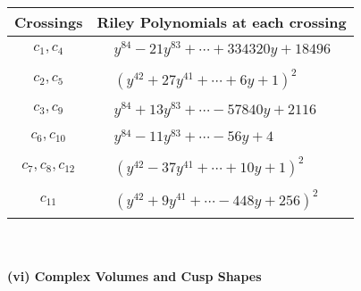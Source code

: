 \documentclass[1p]{elsarticle_modified}
\theoremstyle{definition}
\begin{document}
\begin{tabular}{m{50pt}|m{274pt}}
Crossings & \hspace{64pt}Riley Polynomials at each crossing \\
\hline $$\begin{aligned}c_{1},c_{4}\end{aligned}$$&$\begin{aligned}
&y^{84}-21 y^{83}+\cdots+334320 y+18496
\end{aligned}$\\
\hline $$\begin{aligned}c_{2},c_{5}\end{aligned}$$&$\begin{aligned}
&(y^{42}+27 y^{41}+\cdots+6 y+1)^{2}
\end{aligned}$\\
\hline $$\begin{aligned}c_{3},c_{9}\end{aligned}$$&$\begin{aligned}
&y^{84}+13 y^{83}+\cdots-57840 y+2116
\end{aligned}$\\
\hline $$\begin{aligned}c_{6},c_{10}\end{aligned}$$&$\begin{aligned}
&y^{84}-11 y^{83}+\cdots-56 y+4
\end{aligned}$\\
\hline $$\begin{aligned}c_{7},c_{8},c_{12}\end{aligned}$$&$\begin{aligned}
&(y^{42}-37 y^{41}+\cdots+10 y+1)^{2}
\end{aligned}$\\
\hline $$\begin{aligned}c_{11}\end{aligned}$$&$\begin{aligned}
&(y^{42}+9 y^{41}+\cdots-448 y+256)^{2}
\end{aligned}$\\
\hline
\end{tabular}\\~\\
\newpage\flushleft \textbf{(vi) Complex Volumes and Cusp Shapes}
\end{document}
